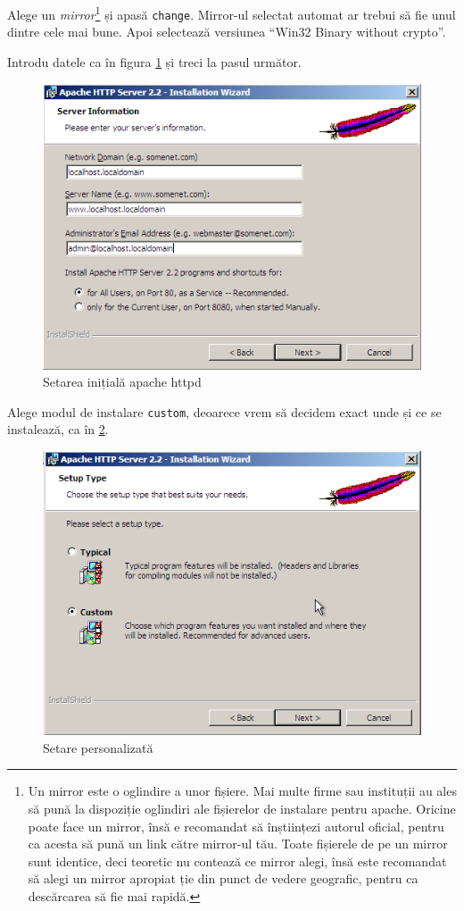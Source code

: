 Alege un \textsl{mirror}\footnote{
Un mirror este o oglindire a unor fișiere. Mai multe firme sau instituții au ales
să pună la dispoziție oglindiri ale fișierelor de instalare pentru apache. Oricine
poate face un mirror, însă e recomandat să înștiințezi autorul oficial, pentru
ca acesta să pună un link către mirror-ul tău. Toate fișierele de pe un mirror sunt identice,
deci teoretic nu contează ce mirror alegi, însă este recomandat să alegi un mirror
apropiat ție din punct de vedere geografic, pentru ca descărcarea să fie mai
rapidă.} și apasă \texttt{change}. Mirror-ul selectat automat ar trebui să fie unul
dintre cele mai bune. Apoi selectează versiunea ``Win32 Binary without crypto''.


Introdu datele ca în figura \ref{fig:httpd setup} și treci la pasul următor.

\begin{figure}[ht!]
  \centering
    \includegraphics[width=300bp]{cap01/Screenshot-2.png}
  \caption{Setarea inițială apache httpd}
  \label{fig:httpd setup}
\end{figure}

Alege modul de instalare \texttt{custom}, deoarece vrem să decidem exact unde și ce
se instalează, ca în \ref{fig:httpd check custom setup}.

\begin{figure}[ht!]
  \centering
    \includegraphics[width=250bp]{cap01/Screenshot-3.png}
  \caption{Setare personalizată}
  \label{fig:httpd check custom setup}
\end{figure}

